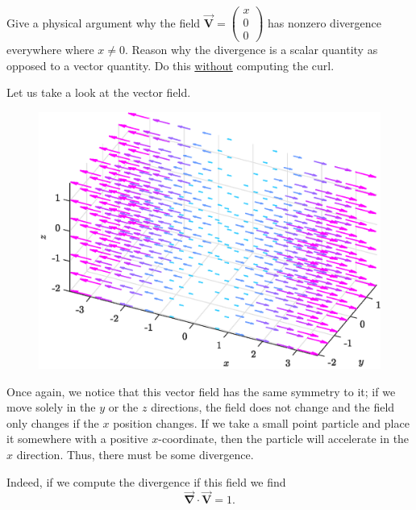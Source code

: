 \documentclass[12pt]{article} %
\newcommand{\grad}{\boldsymbol{\vec{\nabla}}}
\newcommand{\vecfieldV}{\boldsymbol{\vec{V}}}
\begin{document}
\newpage
\begin{problem}
    Give a physical argument why the field $\vecfieldV = \begin{pmatrix} x \\ 0 \\ 0 \end{pmatrix}$ has nonzero divergence everywhere where $x\neq 0$. Reason why the divergence is a scalar quantity as opposed to a vector quantity. Do this \underline{without} computing the curl.
\end{problem}
\begin{solution}
Let us take a look at the vector field.
\begin{figure}[h]
    \centering
    \includegraphics[width=.65\textwidth]{figures/7}
\end{figure}
Once again, we notice that this vector field has the same symmetry to it; if we move solely in the $y$ or the $z$ directions, the field does not change and the field only changes if the $x$ position changes. If we take a small point particle and place it somewhere with a positive $x$-coordinate, then the particle will accelerate in the $x$ direction. Thus, there must be some divergence.

Indeed, if we compute the divergence if this field we find
\[
\grad \cdot \vecfieldV = 1.
\]
\end{solution}
\end{document}
